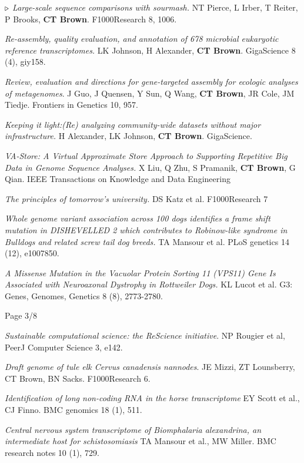 \documentclass[margin,line]{resume}
\begin{document}
\begin{resume}
{\color{red} ${\bf \triangleright}$}
{\em Large-scale sequence comparisons with sourmash.} NT Pierce, L Irber, T Reiter, P Brooks, {\bf CT Brown}. F1000Research 8, 1006.

{\em Re-assembly, quality evaluation, and annotation of 678 microbial eukaryotic reference transcriptomes.} LK Johnson, H Alexander, {\bf CT Brown}. GigaScience 8 (4), giy158.

{\em Review, evaluation and directions for gene-targeted assembly for ecologic analyses of metagenomes}. J Guo, J Quensen, Y Sun, Q Wang, {\bf CT Brown}, JR Cole, JM Tiedje. Frontiers in Genetics 10, 957.

{\em Keeping it light:(Re) analyzing community-wide datasets without major infrastructure.} H Alexander, LK Johnson, {\bf CT Brown}.
GigaScience.

{\em VA-Store: A Virtual Approximate Store Approach to Supporting
  Repetitive Big Data in Genome Sequence Analyses.} X Liu, Q Zhu, S
Pramanik, {\bf CT Brown}, G Qian.  IEEE Transactions on Knowledge and Data
Engineering

{\em The principles of tomorrow's university.} DS Katz et al. F1000Research 7

{\em Whole genome variant association across 100 dogs identifies a frame shift mutation in DISHEVELLED 2 which contributes to Robinow-like syndrome in Bulldogs and related screw tail dog breeds.} TA Mansour et al.
PLoS genetics 14 (12), e1007850.

{\em A Missense Mutation in the Vacuolar Protein Sorting 11 (VPS11) Gene Is Associated with Neuroaxonal Dystrophy in Rottweiler Dogs.} KL Lucot et al.
G3: Genes, Genomes, Genetics 8 (8), 2773-2780.

\vspace{2cm}
{\centerline {Page 3/8}}

\newpage

{\em Sustainable computational science: the ReScience initiative}. NP Rougier et al, PeerJ Computer Science 3, e142.

{\em Draft genome of tule elk Cervus canadensis nannodes}. JE Mizzi, ZT Lounsberry, CT Brown, BN Sacks. F1000Research 6.

{\em Identification of long non-coding RNA in the horse transcriptome} EY Scott et al., CJ Finno. BMC genomics 18 (1), 511.

{\em Central nervous system transcriptome of Biomphalaria alexandrina, an intermediate host for schistosomiasis} TA Mansour et al., MW Miller. BMC research notes 10 (1), 729.


\end{resume}
\end{document}
